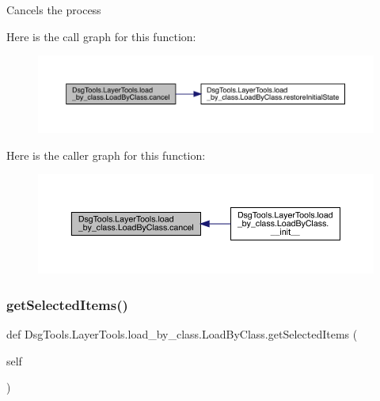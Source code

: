\begin{DoxyVerb}Cancels the process
\end{DoxyVerb}
 Here is the call graph for this function\+:
\nopagebreak
\begin{figure}[H]
\begin{center}
\leavevmode
\includegraphics[width=350pt]{class_dsg_tools_1_1_layer_tools_1_1load__by__class_1_1_load_by_class_a9648d37e3fa7311e4cb454089d3b768a_cgraph}
\end{center}
\end{figure}
Here is the caller graph for this function\+:
\nopagebreak
\begin{figure}[H]
\begin{center}
\leavevmode
\includegraphics[width=350pt]{class_dsg_tools_1_1_layer_tools_1_1load__by__class_1_1_load_by_class_a9648d37e3fa7311e4cb454089d3b768a_icgraph}
\end{center}
\end{figure}
\mbox{\label{class_dsg_tools_1_1_layer_tools_1_1load__by__class_1_1_load_by_class_ad0fcaa51e682f1cf9fbbef4f1e2ac8e3}} 
\subsubsection{\texorpdfstring{get\+Selected\+Items()}{getSelectedItems()}}
{\footnotesize\ttfamily def Dsg\+Tools.\+Layer\+Tools.\+load\+\_\+by\+\_\+class.\+Load\+By\+Class.\+get\+Selected\+Items (\begin{DoxyParamCaption}\item[{}]{self }\end{DoxyParamCaption})}


